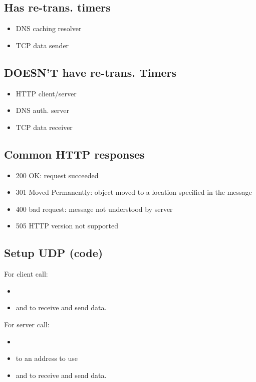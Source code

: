 \subsection{Has re-trans. timers}
\begin{itemize}[itemsep=0em]
  \item DNS caching resolver
  \item TCP data sender
\end{itemize}
\subsection{DOESN'T have re-trans. Timers}
\begin{itemize}[itemsep=0em]
  \item HTTP client/server
  \item DNS auth. server
  \item TCP data receiver
\end{itemize}
\subsection{Common HTTP responses}
\begin{itemize}[itemsep=0em]
  \item 200 OK: request succeeded
  \item 301 Moved Permanently: object moved to a location specified in the message
  \item 400 bad request: message not understood by server
  \item 505 HTTP version not supported
\end{itemize}
\subsection{Setup UDP (code)}
For client call:
\begin{footnotesize}
  \begin{itemize}[itemsep=-0.5em]
    \item {}
    \item {} and  to receive and send data.
  \end{itemize}
\end{footnotesize}
For server call:
\begin{footnotesize}
  \begin{itemize}[itemsep=-0.5em]
    \item {}
    \item {} to an address to use
    \item {} and  to receive and send data.
  \end{itemize}
\end{footnotesize}
